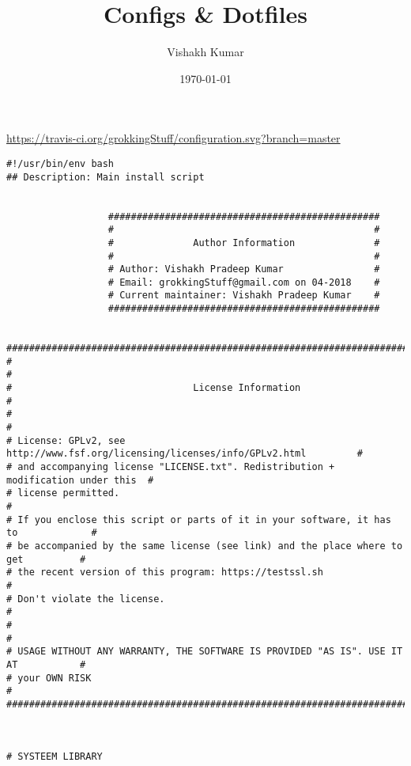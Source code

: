 \documentclass[11pt]{article}
\author{Vishakh Kumar}
\date{\today}
\title{Configs \& Dotfiles}
\begin{document}
\maketitle
\setcounter{tocdepth}{4}
\tableofcontents

\url{https://travis-ci.org/grokkingStuff/configuration.svg?branch=master}

\begin{verbatim}
#!/usr/bin/env bash
## Description: Main install script


                  ################################################
                  #                                              #
                  #              Author Information              #
                  #                                              #
                  # Author: Vishakh Pradeep Kumar                #
                  # Email: grokkingStuff@gmail.com on 04-2018    #
                  # Current maintainer: Vishakh Pradeep Kumar    #
                  ################################################


#####################################################################################
#                                                                                   #
#                                License Information                                #
#                                                                                   #
# License: GPLv2, see http://www.fsf.org/licensing/licenses/info/GPLv2.html         #
# and accompanying license "LICENSE.txt". Redistribution + modification under this  #
# license permitted.                                                                #
# If you enclose this script or parts of it in your software, it has to             #
# be accompanied by the same license (see link) and the place where to get          #
# the recent version of this program: https://testssl.sh                            #
# Don't violate the license.                                                        #
#                                                                                   #
# USAGE WITHOUT ANY WARRANTY, THE SOFTWARE IS PROVIDED "AS IS". USE IT AT           #
# your OWN RISK                                                                     #
#####################################################################################



# SYSTEEM LIBRARY


\end{verbatim}
\end{document}
